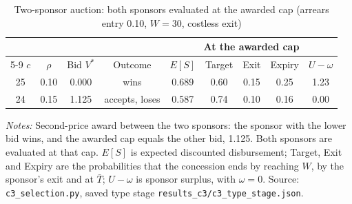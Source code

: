\begin{table}[htbp]\centering\small
\caption{Two-sponsor auction: both sponsors evaluated at the awarded cap (arrears entry 0.10, $W = 30$, costless exit)}\label{tab:c3example}
\begin{threeparttable}\begin{tabular}{ccccccccc}\toprule
 & & & & \multicolumn{5}{c}{At the awarded cap}\\\cmidrule(l){5-9}
$c$ & $\rho$ & Bid $V^*$ & Outcome & $E[S]$ & Target & Exit & Expiry & $U - \omega$\\\midrule
25 & 0.10 & 0.000 & wins & 0.689 & 0.60 & 0.15 & 0.25 & 1.23\\
24 & 0.15 & 1.125 & accepts, loses & 0.587 & 0.74 & 0.10 & 0.16 & 0.00\\
\bottomrule\end{tabular}
\begin{tablenotes}\footnotesize\item \textit{Notes:} Second-price award between the two sponsors: the sponsor with the lower bid wins, and the awarded cap equals the other bid, 1.125. Both sponsors are evaluated at that cap. $E[S]$ is expected discounted disbursement; Target, Exit and Expiry are the probabilities that the concession ends by reaching $W$, by the sponsor's exit and at $\bar T$; $U - \omega$ is sponsor surplus, with $\omega = 0$. Source: \texttt{c3\_selection.py}, saved type stage \texttt{results\_c3/c3\_type\_stage.json}.\end{tablenotes}
\end{threeparttable}\end{table}

